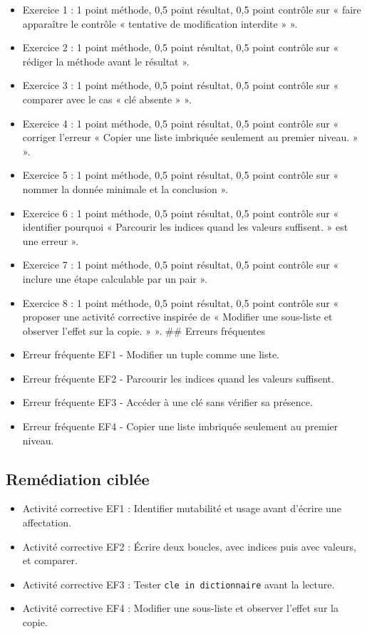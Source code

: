 \begin{itemize}
\tightlist
\item
  Exercice 1 : 1 point méthode, 0,5 point résultat, 0,5 point contrôle
  sur « faire apparaître le contrôle « tentative de modification
  interdite » ».
\item
  Exercice 2 : 1 point méthode, 0,5 point résultat, 0,5 point contrôle
  sur « rédiger la méthode avant le résultat ».
\item
  Exercice 3 : 1 point méthode, 0,5 point résultat, 0,5 point contrôle
  sur « comparer avec le cas « clé absente » ».
\item
  Exercice 4 : 1 point méthode, 0,5 point résultat, 0,5 point contrôle
  sur « corriger l'erreur « Copier une liste imbriquée seulement au
  premier niveau. » ».
\item
  Exercice 5 : 1 point méthode, 0,5 point résultat, 0,5 point contrôle
  sur « nommer la donnée minimale et la conclusion ».
\item
  Exercice 6 : 1 point méthode, 0,5 point résultat, 0,5 point contrôle
  sur « identifier pourquoi « Parcourir les indices quand les valeurs
  suffisent. » est une erreur ».
\item
  Exercice 7 : 1 point méthode, 0,5 point résultat, 0,5 point contrôle
  sur « inclure une étape calculable par un pair ».
\item
  Exercice 8 : 1 point méthode, 0,5 point résultat, 0,5 point contrôle
  sur « proposer une activité corrective inspirée de « Modifier une
  sous-liste et observer l'effet sur la copie. » ». \#\# Erreurs
  fréquentes
\item
  Erreur fréquente EF1 - Modifier un tuple comme une liste.
\item
  Erreur fréquente EF2 - Parcourir les indices quand les valeurs
  suffisent.
\item
  Erreur fréquente EF3 - Accéder à une clé sans vérifier sa présence.
\item
  Erreur fréquente EF4 - Copier une liste imbriquée seulement au premier
  niveau.
\end{itemize}

\subsection{Remédiation ciblée}

\begin{itemize}
\tightlist
\item
  Activité corrective EF1 : Identifier mutabilité et usage avant
  d'écrire une affectation.
\item
  Activité corrective EF2 : Écrire deux boucles, avec indices puis avec
  valeurs, et comparer.
\item
  Activité corrective EF3 : Tester \texttt{cle\ in\ dictionnaire} avant
  la lecture.
\item
  Activité corrective EF4 : Modifier une sous-liste et observer l'effet
  sur la copie.
\end{itemize}

